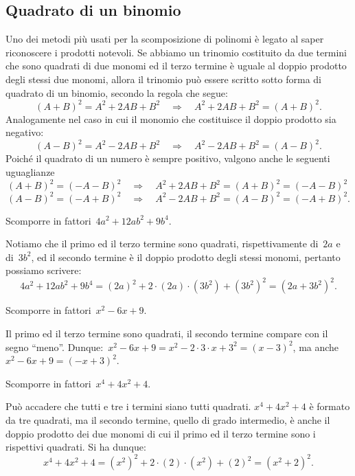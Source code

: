 \subsection{Quadrato di un binomio}

Uno dei metodi più usati per la scomposizione di polinomi è legato al saper riconoscere i prodotti notevoli.
Se abbiamo un trinomio costituito da due termini che sono quadrati di due monomi ed il terzo termine è uguale al doppio prodotto
degli stessi due monomi, allora il trinomio può essere scritto sotto forma di quadrato di un binomio, secondo la regola che segue: %
\begin{equation*}
(A+B)^{2}=A^{2}+2AB+B^{2}\quad \Rightarrow \quad A^{2}+2AB+B^{2}=(A+B)^{2}.
\end{equation*}
Analogamente nel caso in cui il monomio che costituisce il doppio prodotto sia negativo:
\begin{equation*}
(A-B)^{2}=A^{2}-2AB+B^{2}\quad \Rightarrow \quad A^{2}-2AB+B^{2}=(A-B)^{2}.
\end{equation*}
Poiché il quadrato di un numero è sempre positivo, valgono anche le seguenti uguaglianze
\begin{equation*}
(A+B)^{2}=(-A-B)^{2}\quad\Rightarrow\quad A^{2}+2AB+B^{2}=(A+B)^{2}=(-A-B)^{2}\phantom{.}
\end{equation*}
\begin{equation*}
(A-B)^{2}=(-A+B)^{2}\quad \Rightarrow \quad A^{2}-2AB+B^{2}=(A-B)^{2}=(-A+B)^{2}.
\end{equation*}

\begin{exrig}
 \begin{esempio}
Scomporre in fattori~$4a^{2}+12ab^{2}+9b^{4}$.

Notiamo che il primo ed il terzo termine sono quadrati, rispettivamente di~$2a$ e di~$3b^{2}$,
ed il secondo termine è il doppio prodotto degli stessi monomi, pertanto possiamo
scrivere:
\[4a^{2}+12{ab}^{2}+9b^{4}=(2a)^{2}+2\cdot (2a)\cdot (3b^{2})+\left(3b^{2}\right)^{2}=\left(2a+3b^{2}\right)^{2}.\]
 \end{esempio}

 \begin{esempio}
Scomporre in fattori~$x^{2}-6x+9$.

Il primo ed il terzo termine sono quadrati, il secondo termine compare con il segno ``meno''.
Dunque:~$x^{2}-6x+9=x^{2}-2\cdot 3\cdot x+3^{2}=(x-3)^{2}$, ma anche~$x^{2}-6x+9=(-x+3)^{2}$.
 \end{esempio}

 \begin{esempio}
Scomporre in fattori~$x^{4}+4x^{2}+4$.

Può accadere che tutti e tre i termini siano tutti quadrati. $x^{4}+4x^{2}+4$ è formato da tre quadrati, ma il secondo termine, quello di grado intermedio,
è anche il doppio prodotto dei due monomi di cui il primo ed il terzo termine sono i rispettivi quadrati.
Si ha dunque:
\[x^{4}+4x^{2}+4=\left(x^{2}\right)^{2}+2\cdot (2)\cdot (x^{2})+(2)^{2}=\left(x^{2}+2\right)^{2}.\]
 \end{esempio}
\end{exrig}


